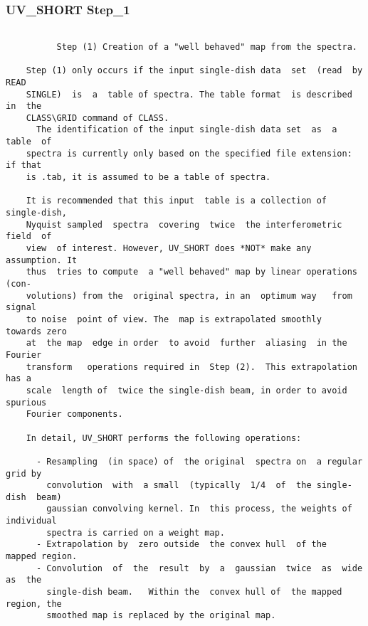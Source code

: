 \subsubsection{UV\_SHORT Step\_1}
\begin{verbatim}

          Step (1) Creation of a "well behaved" map from the spectra.

    Step (1) only occurs if the input single-dish data  set  (read  by  READ
    SINGLE)  is  a  table of spectra. The table format  is described in  the
    CLASS\GRID command of CLASS.
      The identification of the input single-dish data set  as  a  table  of
    spectra is currently only based on the specified file extension: if that
    is .tab, it is assumed to be a table of spectra.

    It is recommended that this input  table is a collection of single-dish,
    Nyquist sampled  spectra  covering  twice  the interferometric field  of
    view  of interest. However, UV_SHORT does *NOT* make any  assumption. It
    thus  tries to compute  a "well behaved" map by linear operations  (con-
    volutions) from the  original spectra, in an  optimum way   from  signal
    to noise  point of view. The  map is extrapolated smoothly  towards zero
    at  the map  edge in order  to avoid  further  aliasing  in the  Fourier
    transform   operations required in  Step (2).  This extrapolation  has a
    scale  length of  twice the single-dish beam, in order to avoid spurious
    Fourier components.

    In detail, UV_SHORT performs the following operations:

      - Resampling  (in space) of  the original  spectra on  a regular  grid by
        convolution  with  a small  (typically  1/4  of  the single-dish  beam)
        gaussian convolving kernel. In  this process, the weights of individual
        spectra is carried on a weight map.
      - Extrapolation by  zero outside  the convex hull  of the  mapped region.
      - Convolution  of  the  result  by  a  gaussian  twice  as  wide  as  the
        single-dish beam.   Within the  convex hull of  the mapped  region, the
        smoothed map is replaced by the original map.

\end{verbatim}
